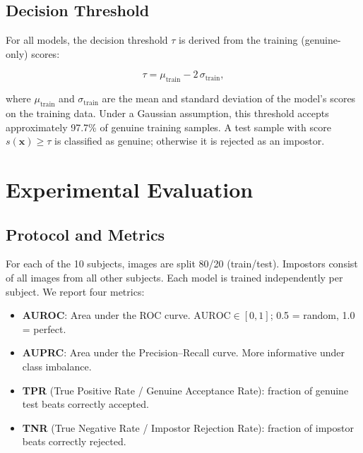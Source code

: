 \documentclass[12pt, a4paper]{article}
\begin{document}
\subsection{Decision Threshold}

For all models, the decision threshold $\tau$ is derived from the
training (genuine-only) scores:

\begin{mathbox}
\begin{equation}
  \tau = \mu_{\text{train}} - 2\,\sigma_{\text{train}},
  \label{eq:threshold}
\end{equation}
\end{mathbox}

\noindent where $\mu_{\text{train}}$ and $\sigma_{\text{train}}$ are
the mean and standard deviation of the model's scores on the training data.
Under a Gaussian assumption, this threshold accepts approximately 97.7\%
of genuine training samples. A test sample with score $s(\mathbf{x}) \geq \tau$
is classified as genuine; otherwise it is rejected as an impostor.

\section{Experimental Evaluation}
\label{sec:experiments}

\subsection{Protocol and Metrics}

For each of the 10 subjects, images are split 80/20 (train/test).
Impostors consist of all images from all other subjects.
Each model is trained independently per subject.
We report four metrics:

\begin{itemize}[leftmargin=2em, itemsep=2pt]
  \item \textbf{AUROC}: Area under the ROC curve.
    $\text{AUROC} \in [0,1]$; 0.5 = random, 1.0 = perfect.
  \item \textbf{AUPRC}: Area under the Precision--Recall curve.
    More informative under class imbalance.
  \item \textbf{TPR} (True Positive Rate / Genuine Acceptance Rate):
    fraction of genuine test beats correctly accepted.
  \item \textbf{TNR} (True Negative Rate / Impostor Rejection Rate):
    fraction of impostor beats correctly rejected.
\end{itemize}
\end{document}

